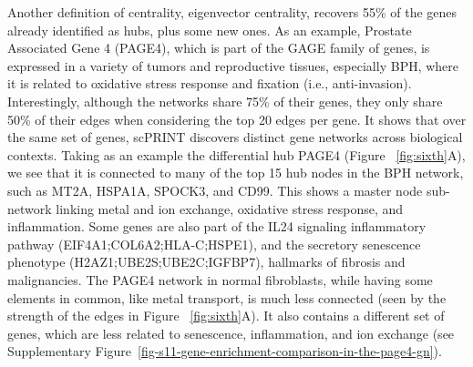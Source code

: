 Another definition of centrality, eigenvector centrality, recovers 55\% of the genes already identified as hubs, plus some new ones. As an example, Prostate Associated Gene 4 (PAGE4), which is part of the GAGE family of genes, is expressed in a variety of tumors and reproductive tissues, especially \gls{BPH}, where it is related to oxidative stress response and fixation (i.e., anti-invasion)\citep{liProstateAssociatedGene42022,josephSingleCellAnalysis2021,lvPAGE4PromotesProstate2019}. Interestingly, although the networks share 75\% of their genes, they only share 50\% of their edges when considering the top 20 edges per gene. It shows that over the same set of genes, \gls{scPRINT} discovers distinct gene networks across biological contexts. Taking as an example the differential hub PAGE4 (Figure ~\ref{fig:sixth}A), we see that it is connected to many of the top 15 hub nodes in the \gls{BPH} network, such as MT2A, HSPA1A, SPOCK3, and CD99. This shows a master node sub-network linking metal and ion exchange, oxidative stress response, and inflammation\citep{diasDownregulationMetallothionein2A2022,luoMechanismPrognosticMarker2023,defreitasCirculating70KDa2022,CD99CrossroadsPhysiology}. Some genes are also part of the IL24 signaling inflammatory pathway (EIF4A1;COL6A2;HLA-C;HSPE1), and the secretory senescence phenotype (H2AZ1;UBE2S;UBE2C;IGFBP7)\citep{milacicReactomePathwayKnowledgebase2024}, hallmarks of fibrosis and malignancies\citep{mausIronAccumulationDrives2023,qianEstablishmentCancerassociatedFibroblastsrelated2023}. The PAGE4 network in normal fibroblasts, while having some elements in common, like metal transport, is much less connected (seen by the strength of the edges in Figure ~\ref{fig:sixth}A). It also contains a different set of genes, which are less related to senescence, inflammation, and ion exchange (see Supplementary Figure~\ref{fig-s11-gene-enrichment-comparison-in-the-page4-gn}).

